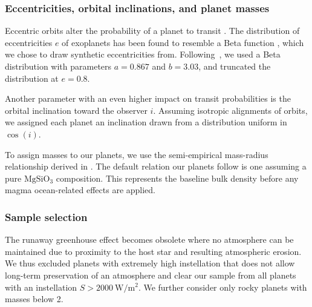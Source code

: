 \documentclass[modern]{aastex631}
\begin{document}
\subsubsection{Eccentricities, orbital inclinations, and planet masses}
Eccentric orbits alter the probability of a planet to transit \citep[e.g.,][]{Barnes2007a}.
The distribution of eccentricities $e$ of exoplanets has been found to resemble a Beta function \citep{Kipping2013b}, which we chose to draw synthetic eccentricities from.
Following~\citet{Kipping2013b}, we used a Beta distribution with parameters $a=0.867$ and $b=3.03$, and truncated the distribution at $e = 0.8$.

Another parameter with an even higher impact on transit probabilities is the orbital inclination toward the observer $i$.
Assuming isotropic alignments of orbits, we assigned each planet an inclination drawn from a distribution uniform in $\cos(i)$.

To assign masses to our planets, we use the semi-empirical mass-radius relationship derived in \citet{Zeng2016}.
The default relation our planets follow is one assuming a pure $\mathrm{MgSiO_3}$ composition.
This represents the baseline bulk density before any magma ocean-related effects are applied.


\subsubsection{Sample selection}
\begin{note}
    The runaway greenhouse effect becomes obsolete where no atmosphere can be maintained due to proximity to the host star and resulting atmospheric erosion.
    We thus excluded planets with extremely high instellation that does not allow long-term preservation of an atmosphere and clear our sample from all planets with an instellation $S > \SI{2000}{\watt\per\square\meter}$.
    We further consider only rocky planets with masses below \SI{2}{\Mearth}. %
\end{note}
\end{document}

